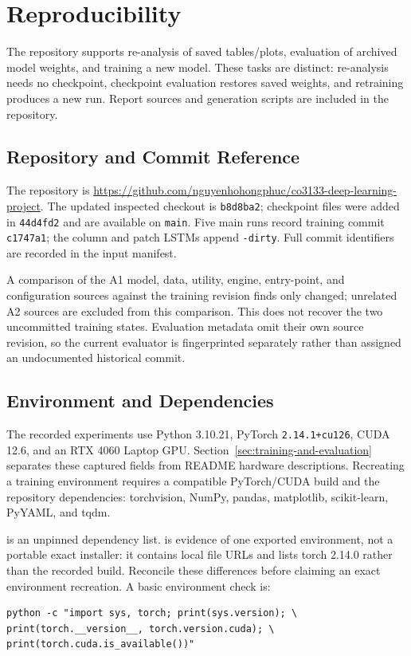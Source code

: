 \section{Reproducibility}
\label{sec:reproducibility}

The repository supports re-analysis of saved tables/plots, evaluation of archived model weights, and training a new model. These tasks are distinct: re-analysis needs no checkpoint, checkpoint evaluation restores saved weights, and retraining produces a new run. Report sources and generation scripts are included in the repository.

\subsection{Repository and Commit Reference}

The repository is \url{https://github.com/nguyenhohongphuc/co3133-deep-learning-project}. The updated inspected checkout is \texttt{b8d8ba2}; checkpoint files were added in \texttt{44d4fd2} and are available on \texttt{main}. Five main runs record training commit \texttt{c1747a1}; the column and patch LSTMs append \texttt{-dirty}. Full commit identifiers are recorded in the input manifest.

A comparison of the A1 model, data, utility, engine, entry-point, and configuration sources against the training revision finds only  changed; unrelated A2 sources are excluded from this comparison. This does not recover the two uncommitted training states. Evaluation metadata omit their own source revision, so the current evaluator is fingerprinted separately rather than assigned an undocumented historical commit.

\subsection{Environment and Dependencies}

The recorded experiments use Python 3.10.21, PyTorch \texttt{2.14.1+cu126}, CUDA 12.6, and an RTX 4060 Laptop GPU. Section~\ref{sec:training-and-evaluation} separates these captured fields from README hardware descriptions. Recreating a training environment requires a compatible PyTorch/CUDA build and the repository dependencies: torchvision, NumPy, pandas, matplotlib, scikit-learn, PyYAML, and tqdm.

 is an unpinned dependency list.  is evidence of one exported environment, not a portable exact installer: it contains local file URLs and lists torch 2.14.0 rather than the recorded build. Reconcile these differences before claiming an exact environment recreation. A basic environment check is:
\begin{verbatim}
python -c "import sys, torch; print(sys.version); \
print(torch.__version__, torch.version.cuda); \
print(torch.cuda.is_available())"
\end{verbatim}

